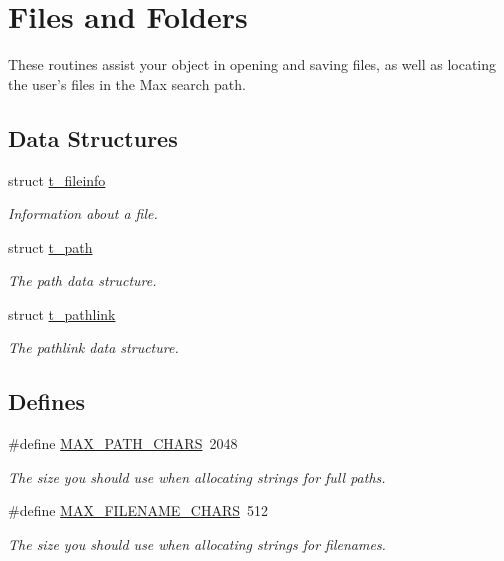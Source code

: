\hypertarget{group__files}{
\section{Files and Folders}
\label{group__files}
}


These routines assist your object in opening and saving files, as well as locating the user’s files in the Max search path.  
\subsection*{Data Structures}
\begin{DoxyCompactItemize}
\item 
struct \hyperlink{structt__fileinfo}{t\_\-fileinfo}
\begin{DoxyCompactList}\small\item\em Information about a file. \item\end{DoxyCompactList}\item 
struct \hyperlink{structt__path}{t\_\-path}
\begin{DoxyCompactList}\small\item\em The path data structure. \item\end{DoxyCompactList}\item 
struct \hyperlink{structt__pathlink}{t\_\-pathlink}
\begin{DoxyCompactList}\small\item\em The pathlink data structure. \item\end{DoxyCompactList}\end{DoxyCompactItemize}
\subsection*{Defines}
\begin{DoxyCompactItemize}
\item 
\hypertarget{group__files_ga513fe2710e225c840d9295fb9884607b}{
\#define \hyperlink{group__files_ga513fe2710e225c840d9295fb9884607b}{MAX\_\-PATH\_\-CHARS}~2048}
\label{group__files_ga513fe2710e225c840d9295fb9884607b}

\begin{DoxyCompactList}\small\item\em The size you should use when allocating strings for full paths. \item\end{DoxyCompactList}\item 
\#define \hyperlink{group__files_ga481556de2ccf516a499525edebc45ee8}{MAX\_\-FILENAME\_\-CHARS}~512
\begin{DoxyCompactList}\small\item\em The size you should use when allocating strings for filenames. \item\end{DoxyCompactList}\end{DoxyCompactItemize}
